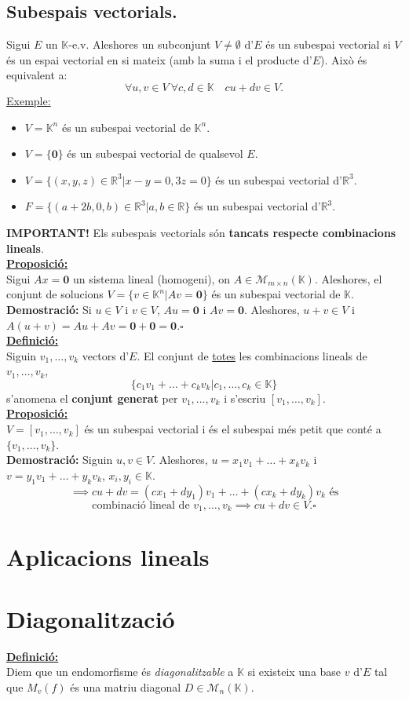 \documentclass[11pt]{article}
\newcommand{\fieldk}{\mathbb{K}}
\newcommand{\definicio}{\underline{\textbf{Definició:}} \\}
\newcommand{\proposicio}{\underline{\textbf{Proposició:}} \\}
\newcommand{\demostracio}{\textbf{Demostració:} }
\newcommand{\ex}{\underline{Exemple:} }
\newcommand{\important}{\textbf{IMPORTANT! }}
\begin{document}
\subsection{Subespais vectorials.}
Sigui $E$ un $\fieldk$-e.v. Aleshores un subconjunt $V\neq\emptyset$ d'$E$ és un subespai vectorial si $V$ és un espai vectorial en si mateix (amb la suma i el producte d'$E$). Això és equivalent a:
$$\forall u,v\in V \ \forall c,d\in\fieldk \quad cu+dv\in V.$$
\ex \begin{itemize}
	\item $V=\fieldk^n$ és un subespai vectorial de $\fieldk^n$.
	\item $V=\{\textbf{0}\}$ és un subespai vectorial de qualsevol $E$.
	\item $V=\{(x,y,z)\in\mathbb{R}^3|x-y=0,3z=0\}$ és un subespai vectorial d'$\mathbb{R}^3$.
	\item $F=\{(a+2b,0,b)\in\mathbb{R}^3|a,b\in\mathbb{R}\}$ és un subespai vectorial d'$\mathbb{R}^3$.
\end{itemize}
\newpage
\noindent \important Els subespais vectorials són \textbf{tancats respecte combinacions lineals}.\\
\proposicio Sigui $Ax=\textbf{0}$ un sistema lineal (homogeni), on $A\in\mathcal{M}_{m\times n}(\fieldk)$. Aleshores, el conjunt de solucions $V=\{v\in\fieldk^n|Av=\textbf{0}\}$ és un subespai vectorial de $\fieldk$.\\
\demostracio Si $u\in V$ i $v\in V$, $Au=\textbf{0}$ i $Av=\textbf{0}$. Aleshores, $u+v\in V$ i $A(u+v)=Au+Av=\textbf{0}+\textbf{0}=\textbf{0}$.$\square$\\
\definicio Siguin $v_1,\ldots,v_k$ vectors d'$E$. El conjunt de \underline{totes} les combinacions lineals de $v_1,\ldots,v_k$,
$$\{c_1v_1+\ldots+c_kv_k|c_1,\ldots,c_k\in\fieldk\}$$
s'anomena el \textbf{conjunt generat} per $v_1,\ldots,v_k$ i s'escriu $[v_1,\ldots,v_k]$.\\
\proposicio $V=[v_1,\ldots,v_k]$ és un subespai vectorial i és el subespai més petit que conté a $\{v_1,\ldots,v_k\}$.\\
\demostracio Siguin $u,v\in V$. Aleshores, $u=x_1v_1+\ldots+x_kv_k$ i $v=y_1v_1+\ldots+y_kv_k$, $x_i,y_i\in\fieldk$.
$$\implies cu+dv=(cx_1+dy_1)v_1+\ldots+(cx_k+dy_k)v_k\textrm{ és}$$
$$\textrm{combinació lineal de }v_1,\ldots,v_k\implies cu+dv\in V.\square$$

\newpage
\section{Aplicacions lineals}

\newpage
\section{Diagonalització}
\definicio Diem que un endomorfisme és \textit{diagonalitzable} a $\fieldk$ si existeix una base $v$ d'$E$ tal que $M_v(f)$ és una matriu diagonal $D\in\mathcal{M}_n(\fieldk)$.
\newpage
\end{document}
